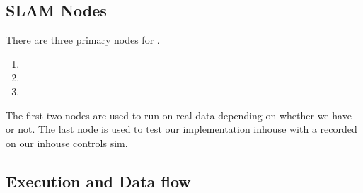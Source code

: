 \documentclass[letterpaper,10pt,english]{sphinxmanual}
\begin{document}
\subsection{SLAM Nodes}
\label{\detokenize{implementation:slam-nodes}}
\sphinxAtStartPar
There are three primary nodes for {\hyperref[\detokenize{glossary:term-SLAM}]{}}.
\begin{enumerate}
%
\item {} 
\sphinxAtStartPar
{}

\item {} 
\sphinxAtStartPar
{}

\item {} 
\sphinxAtStartPar
{}

\end{enumerate}

\sphinxAtStartPar
The first two nodes are used to run on real data depending on whether we have {\hyperref[\detokenize{glossary:term-GPS}]{}} or not. The last node is used to test our {\hyperref[\detokenize{glossary:term-SLAM}]{}} implementation in\sphinxhyphen{}house with a {\hyperref[\detokenize{glossary:term-Rosbag}]{}} recorded on our in\sphinxhyphen{}house controls sim.


\subsection{Execution and Data flow}
\label{\detokenize{implementation:execution-and-data-flow}}
\sphinxAtStartPar
{} {\hyperref[\detokenize{glossary:term-iSAM2}]{}} 
\end{document}
